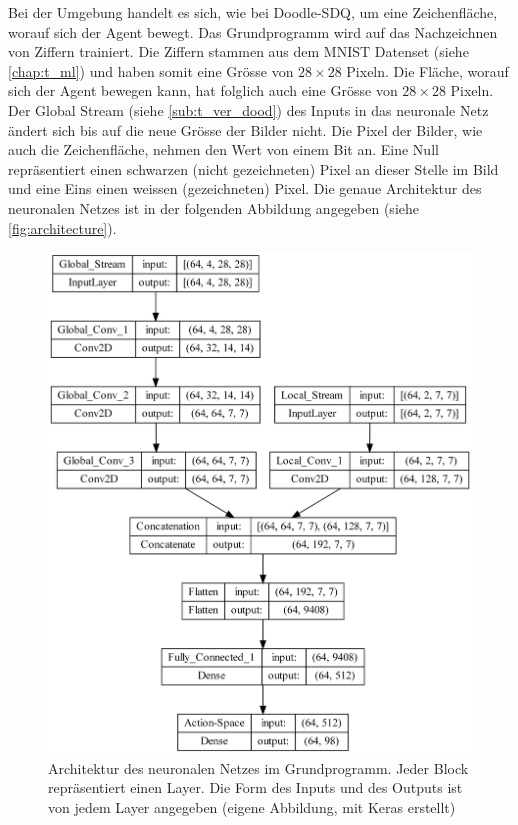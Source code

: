 Bei der Umgebung handelt es sich, wie bei Doodle-SDQ, um eine Zeichenfläche,
worauf sich der Agent bewegt. Das Grundprogramm wird auf das
Nachzeichnen von Ziffern trainiert. Die Ziffern stammen aus dem MNIST Datenset
(siehe \ref{chap:t_ml}) und haben somit eine Grösse von $28\times28$
Pixeln. Die Fläche, worauf sich der Agent bewegen  
kann, hat folglich auch eine Grösse von $28\times28$ Pixeln. Der Global Stream
(siehe \ref{sub:t_ver_dood}) des Inputs in das neuronale Netz ändert sich
bis auf die neue Grösse der Bilder nicht. Die Pixel der Bilder, wie auch die
Zeichenfläche, nehmen den Wert von einem Bit an. Eine Null repräsentiert einen
schwarzen (nicht gezeichneten) Pixel an dieser Stelle im Bild und eine Eins
einen weissen (gezeichneten) Pixel. Die genaue Architektur des neuronalen Netzes
ist in der folgenden Abbildung angegeben (siehe \autoref{fig:architecture}). 
 
\begin{figure}[!ht]
 \centering
 \includegraphics[width=\textwidth-4cm]{images/methode/architecture.png}
 \caption{Architektur des neuronalen Netzes im Grundprogramm. Jeder Block repräsentiert einen Layer. Die Form des Inputs und des Outputs ist von jedem Layer angegeben (eigene Abbildung, mit Keras erstellt)}\label{fig:architecture}
\end{figure}
 
